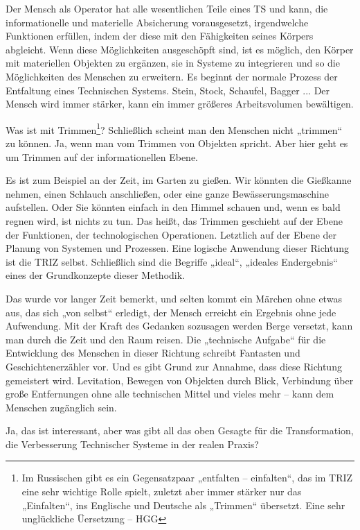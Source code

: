 \documentclass[11pt,a4paper]{article}
\begin{document}
Der Mensch als Operator hat alle wesentlichen Teile eines TS und kann, die
informationelle und materielle Absicherung vorausgesetzt, irgendwelche
Funktionen erfüllen, indem der diese mit den Fähigkeiten seines Körpers
abgleicht. Wenn diese Möglichkeiten ausgeschöpft sind, ist es möglich, den
Körper mit materiellen Objekten zu ergänzen, sie in Systeme zu integrieren und
so die Möglichkeiten des Menschen zu erweitern. Es beginnt der normale Prozess
der Entfaltung eines Technischen Systems.  Stein, Stock, Schaufel, Bagger ...
Der Mensch wird immer stärker, kann ein immer größeres Arbeitsvolumen
bewältigen.

Was ist mit Trimmen\footnote{Im Russischen gibt es ein Gegensatzpaar
  „entfalten -- einfalten“, das im TRIZ eine sehr wichtige Rolle spielt,
  zuletzt aber immer stärker nur das „Einfalten“, ins Englische und Deutsche
  als „Trimmen“ übersetzt.  Eine sehr unglückliche Üersetzung -- HGG}?
Schließlich scheint man den Menschen nicht „trimmen“ zu können. Ja, wenn man
vom Trimmen von Objekten spricht. Aber hier geht es um Trimmen auf der
informationellen Ebene.

Es ist zum Beispiel an der Zeit, im Garten zu gießen. Wir könnten die
Gießkanne nehmen, einen Schlauch anschließen, oder eine ganze
Bewässerungsmaschine aufstellen. Oder Sie könnten einfach in den Himmel
schauen und, wenn es bald regnen wird, ist nichts zu tun. Das heißt, das
Trimmen geschieht auf der Ebene der Funktionen, der technologischen
Operationen. Letztlich auf der Ebene der Planung von Systemen und Prozessen.
Eine logische Anwendung dieser Richtung ist die TRIZ selbst. Schließlich sind
die Begriffe „ideal“, „ideales Endergebnis“ eines der Grundkonzepte dieser
Methodik.

Das wurde vor langer Zeit bemerkt, und selten kommt ein Märchen ohne etwas
aus, das sich „von selbst“ erledigt, der Mensch erreicht ein Ergebnis ohne
jede Aufwendung.  Mit der Kraft des Gedanken sozusagen werden Berge versetzt,
kann man durch die Zeit und den Raum reisen.  Die „technische Aufgabe“ für die
Entwicklung des Menschen in dieser Richtung schreibt Fantasten und
Geschichtenerzähler vor. Und es gibt Grund zur Annahme, dass diese Richtung
gemeistert wird. Levitation, Bewegen von Objekten durch Blick, Verbindung über
große Entfernungen ohne alle technischen Mittel und vieles mehr -- kann dem
Menschen zugänglich sein.

Ja, das ist interessant, aber was gibt all das oben Gesagte für die
Transformation, die Verbesserung Technischer Systeme in der realen Praxis?
\end{document}
